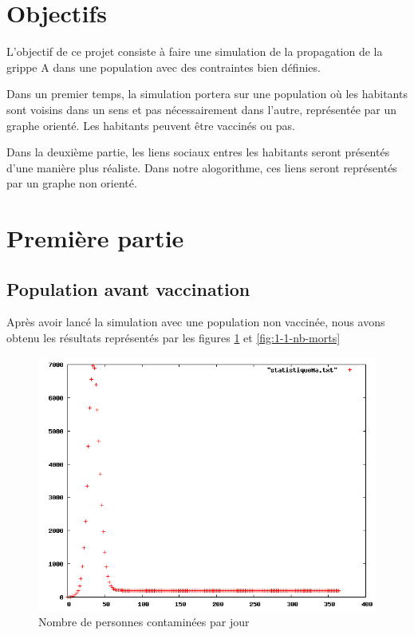 \documentclass[12pt,a4paper,titlepage]{report}
\begin{document}

{}
\renewcommand\headrulewidth{2pt}


\section*{Objectifs}
\thispagestyle{fancy}
\par L'objectif de ce projet consiste à faire une simulation de la propagation de la grippe A dans une population avec des contraintes bien définies. 
\par Dans un premier temps, la simulation portera sur une population où les habitants sont voisins dans un sens et pas nécessairement dans l'autre, représentée par un graphe orienté. Les habitants peuvent être vaccinés ou pas. 
\par Dans la deuxième partie, les liens sociaux entres les habitants seront présentés d'une manière plus réaliste. Dans notre alogorithme, ces liens seront représentés par un graphe non orienté.


%

\section*{Première partie}
\subsection*{Population avant vaccination}
Après avoir lancé la simulation avec une population non vaccinée, nous avons obtenu 
les résultats représentés par les figures \ref{fig:1-1-nb-malades} et \ref{fig:1-1-nb-morts}   

\begin{figure}[htbp] 
  \centering
  \includegraphics[width=15cm]{1-1-statistiqueMa.png}
  \caption{Nombre de personnes contaminées par jour}
  \label{fig:1-1-nb-malades}
\end{figure}
\end{document}
